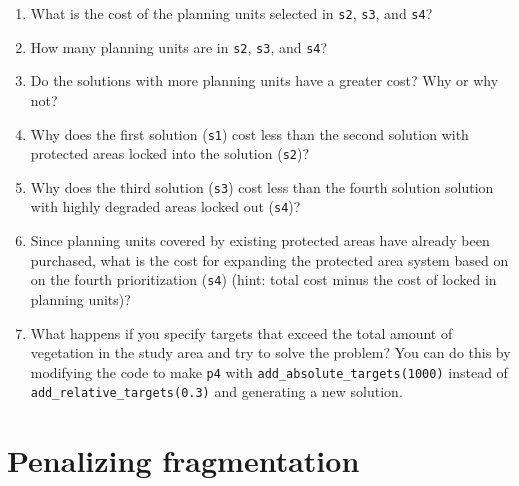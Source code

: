 \documentclass[
  12pt,
]{book}
\makeatletter
\providecommand{\tightlist}{%
  \setlength{\itemsep}{0pt}\setlength{\parskip}{0pt}}
\newenvironment{kframe}{%
\medskip{}
\setlength{\fboxsep}{.8em}
 \def\at@end@of@kframe{}%
 \ifinner\ifhmode%
  \def\at@end@of@kframe{\end{minipage}}%
  \begin{minipage}{\columnwidth}%
 \fi\fi%
 \def\FrameCommand##1{\hskip\@totalleftmargin \hskip-\fboxsep
 \colorbox{shadecolor}{##1}\hskip-\fboxsep
     \hskip-\linewidth \hskip-\@totalleftmargin \hskip\columnwidth}%
 \MakeFramed {\advance\hsize-\width
   \@totalleftmargin\z@ \linewidth\hsize
   \@setminipage}}%
 {\par\unskip\endMakeFramed%
 \at@end@of@kframe}
\newenvironment{rmdblock}[1]
  {
  \begin{itemize}
  \renewcommand{\labelitemi}{
    \raisebox{-.7\height}[0pt][0pt]{
      {\setkeys{Gin}{width=3em,keepaspectratio}\texttt{[image: images/\#1]}}
    }
  }
  \setlength{\fboxsep}{1em}
  \begin{kframe}
  \item
  }
  {
  \end{kframe}
  \end{itemize}
  }
\newenvironment{rmdquestion}
  {\begin{rmdblock}{question}}
  {\end{rmdblock}}
\makeatother
\begin{document}
\begin{rmdquestion}
\begin{enumerate}
\def\labelenumi{\arabic{enumi}.}
\tightlist
\item
  What is the cost of the planning units selected in \texttt{s2}, \texttt{s3}, and \texttt{s4}?
\item
  How many planning units are in \texttt{s2}, \texttt{s3}, and \texttt{s4}?
\item
  Do the solutions with more planning units have a greater cost? Why or why not?
\item
  Why does the first solution (\texttt{s1}) cost less than the second solution with protected areas locked into the solution (\texttt{s2})?
\item
  Why does the third solution (\texttt{s3}) cost less than the fourth solution solution with highly degraded areas locked out (\texttt{s4})?
\item
  Since planning units covered by existing protected areas have already been purchased, what is the cost for expanding the protected area system based on on the fourth prioritization (\texttt{s4}) (hint: total cost minus the cost of locked in planning units)?
\item
  What happens if you specify targets that exceed the total amount of vegetation in the study area and try to solve the problem? You can do this by modifying the code to make \texttt{p4} with \texttt{add\_absolute\_targets(1000)} instead of \texttt{add\_relative\_targets(0.3)} and generating a new solution.
\end{enumerate}
\end{rmdquestion}

\hypertarget{penalizing-fragmentation}{%
\section{Penalizing fragmentation}\label{penalizing-fragmentation}}
\end{document}
